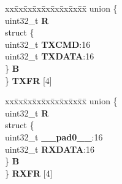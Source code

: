 \begin{DoxyCompactItemize}
\begin{tabbing}
\end{tabbing}\item 
\mbox{\label{structDSPI__tag_a1152e447eb9ec1222c010b2981054e7e}} 
\begin{tabbing}
xx\=xx\=xx\=xx\=xx\=xx\=xx\=xx\=xx\=\kill
union \{\\
\>uint32\_t {\bfseries R}\\
\>struct \{\\
\>\>uint32\_t {\bfseries TXCMD}:16\\
\>\>uint32\_t {\bfseries TXDATA}:16\\
\>\} {\bfseries B}\\
\} {\bfseries TXFR} \mbox{[}4\mbox{]}\\

\end{tabbing}\item 
\mbox{\label{structDSPI__tag_acca83c3f1540b0a755cf256e07e5208e}} 
\begin{tabbing}
xx\=xx\=xx\=xx\=xx\=xx\=xx\=xx\=xx\=\kill
union \{\\
\>uint32\_t {\bfseries R}\\
\>struct \{\\
\>\>uint32\_t {\bfseries \_\_pad0\_\_}:16\\
\>\>uint32\_t {\bfseries RXDATA}:16\\
\>\} {\bfseries B}\\
\} {\bfseries RXFR} \mbox{[}4\mbox{]}\\


\end{tabbing}
\end{DoxyCompactItemize}
